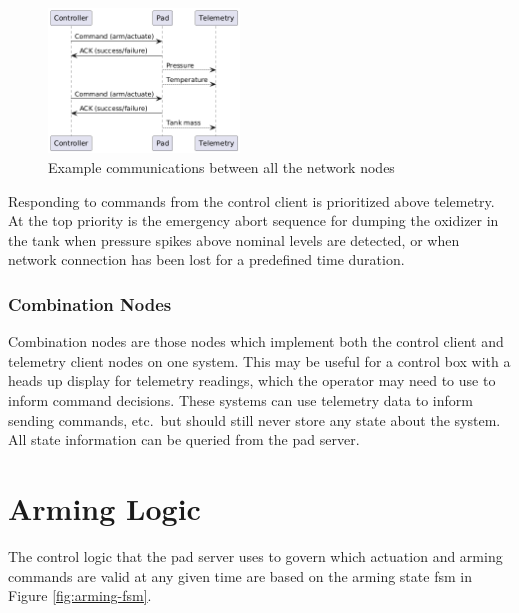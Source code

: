 \begin{figure}[H]
    \center
    \includegraphics[width=2in]{assets/diagrams/all_nodes_seq.png}
    \caption{Example communications between all the network nodes}
\end{figure}

Responding to commands from the control client is prioritized above telemetry. At the top priority is the emergency
abort sequence for dumping the oxidizer in the tank when pressure spikes above nominal levels are detected, or when
network connection has been lost for a predefined time duration.

\subsubsection{Combination Nodes}

Combination nodes are those nodes which implement both the control client and telemetry client nodes on one system.
This may be useful for a control box with a heads up display for telemetry readings, which the operator may need to use
to inform command decisions. These systems can use telemetry data to inform sending commands, etc.\ but should still
never store any state about the system. All state information can be queried from the pad server.

\section{Arming Logic}

The control logic that the pad server uses to govern which actuation and arming commands are valid at any given time
are based on the arming state \gls{fsm} in Figure \ref{fig:arming-fsm}.

